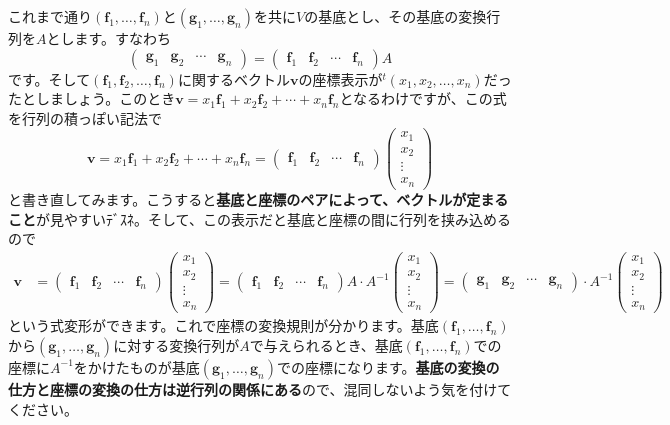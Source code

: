 これまで通り$(\bm{f}_1, \ldots, \bm{f}_n)$と$(\bm{g}_1, \ldots, \bm{g}_n)$を共に$V$の基底とし、その基底の変換行列を$A$とします。すなわち
\[
\begin{pmatrix}
\bm{g}_1 & \bm{g}_2 & \cdots & \bm{g}_n
\end{pmatrix}
=
\begin{pmatrix}
\bm{f}_1 & \bm{f}_2 & \cdots & \bm{f}_n
\end{pmatrix} A
\]
です。そして$(\bm{f}_1, \bm{f}_2, \ldots, \bm{f}_n)$に関するベクトル$\bm{v}$の座標表示が${}^t(x_1, x_2 ,\ldots, x_n)$だったとしましょう。このとき$\bm{v} = x_1 \bm{f}_1 + x_2 \bm{f}_2 + \cdots + x_n \bm{f}_n$となるわけですが、この式を行列の積っぽい記法で
\[
\bm{v} = x_1 \bm{f}_1 + x_2 \bm{f}_2 + \cdots + x_n \bm{f}_n
=
\begin{pmatrix}
\bm{f}_1 & \bm{f}_2 & \cdots & \bm{f}_n
\end{pmatrix}
\begin{pmatrix}
x_1 \\
x_2 \\
\vdots \\
x_n
\end{pmatrix}
\]
と書き直してみます。こうすると\textbf{基底と座標のペアによって、ベクトルが定まること}が見やすいﾃﾞｽﾈ。そして、この表示だと基底と座標の間に行列を挟み込めるので
\begin{align*}
\bm{v}
&= 
\begin{pmatrix}
\bm{f}_1 & \bm{f}_2 & \cdots & \bm{f}_n
\end{pmatrix}
\begin{pmatrix}
x_1 \\
x_2 \\
\vdots \\
x_n
\end{pmatrix}
=
\begin{pmatrix}
\bm{f}_1 & \bm{f}_2 & \cdots & \bm{f}_n
\end{pmatrix}
A\cdot A^{-1}
\begin{pmatrix}
x_1 \\
x_2 \\
\vdots \\
x_n
\end{pmatrix}
=
\begin{pmatrix}
\bm{g}_1 & \bm{g}_2 & \cdots & \bm{g}_n
\end{pmatrix}
\cdot A^{-1}
\begin{pmatrix}
x_1 \\
x_2 \\
\vdots \\
x_n
\end{pmatrix}
\end{align*}
という式変形ができます。これで座標の変換規則が分かります。基底$(\bm{f}_1, \ldots, \bm{f}_n)$から$(\bm{g}_1, \ldots, \bm{g}_n)$に対する変換行列が$A$で与えられるとき、基底$(\bm{f}_1, \ldots, \bm{f}_n)$での座標に$A^{-1}$をかけたものが基底$(\bm{g}_1, \ldots, \bm{g}_n)$での座標になります。\textbf{基底の変換の仕方と座標の変換の仕方は逆行列の関係にある}ので、混同しないよう気を付けてください。

